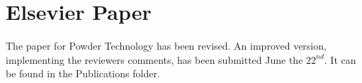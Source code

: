 
\section{Elsevier Paper}
\label{sec:elsevierpaper}

The paper for Powder Technology has been revised.
An improved version, implementing the reviewers comments, has been submitted
June the $22^{nd}$.
It can be found in the Publications folder.\\
